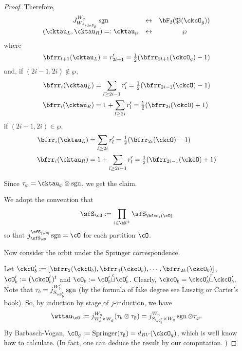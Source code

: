 \documentclass[12pt,a4paper]{amsart}
\def\abs#1{\left|{#1}\right|}
\newcommand{\sgn}{\operatorname{sgn}}
\numberwithin{equation}{section}
\theoremstyle{remark}
\def\half{{\tfrac{1}{2}}}
\def\lamckg{\lambda_{\ckcO_g}}
\def\cuprow{{\stackrel{r}{\sqcup}}}
\def\cupcol{{\stackrel{c}{\sqcup}}}
\def\Spr{\mathrm{Springer}}
\def\CPP{\mathfrak{P}}
\def\sP{\wp}
\begin{document}
\begin{proof}
{  Therefore,
  \[
    \begin{array}{ccc}
      J_{W_{\lamckg}}^{W_{g}} \sgn
      &\leftrightarrow&  \bF_{2}(\CPP(\ckcO_{g}))\\
     (\cktau_{L},\cktau_{R}) =:\cktau_{\sP}&\leftrightarrow & \sP
    \end{array}
  \]
  where
  \[
  \bfrr_{l+1}(\cktau_{L})  =
      r'_{2l+1} =
      \half (\bfrr_{2l+1}(\ckcO_{g})-1)
  \]
  and, if $(2i-1,2i)\notin \sP$,
  \[
    \begin{split}
      \bfrr_{i}(\cktau_{L}) & = \sum_{l\geq 2i-1} r'_{l}
      = \half(\bfrr_{2i-1}(\ckcO)-1)\\
      \bfrr_{i}(\cktau_{R}) & = 1 + \sum_{l\geq 2i} r'_{l}
      = \half(\bfrr_{2i}(\ckcO)+1)
    \end{split}
  \]
  if $(2i-1,2i)\in \sP$,
  \[
    \begin{split}
      \bfrr_{i}(\cktau_{L}) & = \sum_{l\geq 2i} r'_{l}
      = \half(\bfrr_{2i}(\ckcO)-1)\\
      \bfrr_{i}(\cktau_{R}) & = 1 + \sum_{l\geq 2i-1} r'_{l}
      = \half(\bfrr_{2i-1}(\ckcO)+1)
    \end{split}
  \]


  Since $\tau_{\sP} = \cktau_{\sP}\otimes \sgn$, we get the claim.

  We adopt the convention that
  \[
    \sfS_{\cO} := \prod_{i\in \bN^{+}}\sfS_{\bfcc_{i}(\cO)}
  \]
  so that $j_{\sfS_{\cO}}^{\sfS_{\abs{\cO}}}\sgn = \cO$ for each partition $\cO$.

  Now consider the orbit under the Springer correspondence.

  Let
  $\ckcO'_{b}: = [\bfrr_{2}(\ckcO_{b}), \bfrr_{4}(\ckcO_{b}),\cdots, \bfrr_{2k}(\ckcO_{b})]$,
  $\cO'_{b}:=(\ckcO'_{b})^{t}$ and $\cO_{b}:=\cO'_{b}\cupcol \cO'_{b}$.
  Clearly, $\ckcO_{b} = \ckcO'_{b}\cuprow \ckcO'_{b}$.
  Note that $\tau_{b} = j_{S_{\cO'_{b}}}^{W'_{b}} \sgn$ (by the formula of fake
  degree see Lusztig or Carter's book). So, by induction by stage of
  $j$-induction, we have
  \[
    \wttau_{\cO}:= j_{W'_{b}\times W_{g}}^{W_{n}} (\tau_{b}\otimes \tau_{\emptyset}) = j_{S_{\cO'_{b}}\times W_{g}}^{W_{n}} \sgn\otimes \tau_{\sP}.
  \]
  By Barbasch-Vogan, $\cO_{g}:=\Spr(\tau_{\emptyset}) = d_{BV}(\ckcO_{g})$,
  which is well know how to calculate. (In fact, one can deduce the result by
  our computation. )

}
\end{proof}
\end{document}
